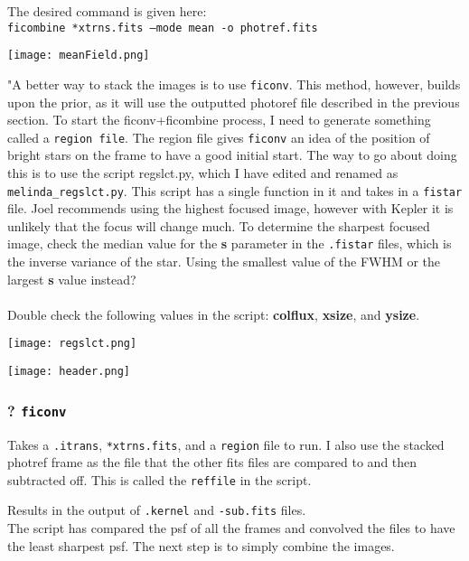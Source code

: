 The desired command is given here:\\
\texttt{ficombine *xtrns.fits --mode mean -o photref.fits}
\begin{center}
\texttt{[image: meanField.png]}
\end{center}

"A better way to stack the images is to use \texttt{ficonv}. This method, however, builds upon the prior, as it will use the outputted photoref file described in the previous section. 
To start the ficonv+ficombine process, I need to generate something called a \texttt{region file}. The region file gives \texttt{ficonv} an idea of the position of bright stars on the frame to have a good initial start.
The way to go about doing this is to use the script regslct.py, which I have edited and renamed as \texttt{melinda\_regslct.py}.
This script has a single function in it and takes in a \texttt{fistar} file. Joel recommends using the highest focused image, however with Kepler it is unlikely that the focus will change much. To determine the sharpest focused image, check the median value for the \textbf{s} parameter in the \texttt{.fistar} files, which is the inverse variance of the star.
Using the smallest value of the FWHM or the largest \textbf{s} value instead?\\ \\ 
Double check the following values in the script: \textbf{colflux},  \textbf{xsize}, and \textbf{ysize}.
\begin{center}
\texttt{[image: regslct.png]}
\end{center}
\begin{center}
\texttt{[image: header.png]}
\end{center}

\subsubsection*{? \texttt{ficonv}}
Takes a \texttt{.itrans}, \texttt{*xtrns.fits}, and a \texttt{region} file to run. I also use the stacked photref frame as the file that the other fits files are compared to and then subtracted off. This is called the \texttt{reffile} in the script.\\

\here

Results in the output of \texttt{.kernel} and \texttt{-sub.fits} files. \\ 
The script has compared the psf of all the frames and convolved the files to have the least sharpest psf. 
The next step is to simply combine the images.

